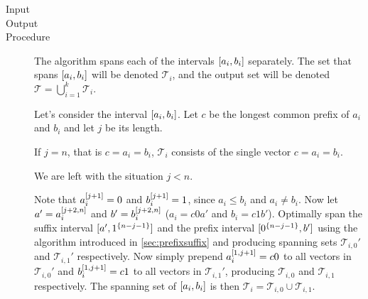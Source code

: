 \begin{algorithm}
\label{algorithm:spd}

\hfill

\begin{description}
\item[Input]
\minintinput

\item[Output]
\minintoutput

\item[Procedure]
The algorithm spans each of
the intervals $[a_i, b_i]$ separately.
The set that spans $[a_i, b_i]$ will be denoted
$\mathcal{T}_i$,
and the output set will be denoted
$\mathcal{T} = \bigcup_{i=1}^k{\mathcal{T}_i}$.

Let's consider the interval $[a_i, b_i]$.
Let $c$ be the longest common prefix of $a_i$ and $b_i$
and let $j$ be its length.

If $j = n$, that is $c = a_i = b_i$,
$\mathcal{T}_i$ consists of the single vector
$c = a_i = b_i$.

We are left with the situation $j < n$.

Note that $a_i^{[j+1]} = 0$ and $b_i^{[j+1]} = 1$,
since $a_i \leq b_i$ and $a_i \neq b_i$.
Now let $a' = a_i^{[j+2, n]}$
and $b' = b_i^{[j+2, n]}$
($a_i = c 0 a'$ and $b_i = c 1 b'$).
Optimally span the suffix interval
$[a', 1^{\{n-j-1\}}]$
and the prefix interval
$[0^{\{n-j-1\}}, b']$
using the
algorithm
introduced in \cref{sec:prefixsuffix}
and producing spanning sets
$\mathcal{T}_{i, 0}'$
and $\mathcal{T}_{i, 1}'$ respectively.
Now simply prepend $a_i^{[1, j+1]} = c 0$
to all vectors in $\mathcal{T}_{i, 0}'$
and $b_i^{[1, j+1]} = c 1$
to all vectors in $\mathcal{T}_{i, 1}'$,
producing $\mathcal{T}_{i, 0}$
and $\mathcal{T}_{i, 1}$ respectively.
The spanning set of $[a_i, b_i]$
is then
$\mathcal{T}_i
= \mathcal{T}_{i, 0} \cup \mathcal{T}_{i, 1}$.
\end{description}
\end{algorithm}


